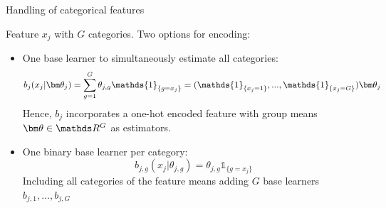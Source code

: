 \documentclass[11pt,compress,t,notes=noshow, xcolor=table]{beamer}
\begin{document}

\begin{framev}{Handling of categorical features}

Feature $x_j$ with $G$ categories. Two options for encoding:

\begin{itemize}
    \item 
        One base learner to simultaneously estimate all categories: 
        $$b_j(x_j | \thetav_j) = \sum_{g=1}^G \theta_{j,g}\mathds{1}_{\{g = x_j\}} = (\mathds{1}_{\{x_j = 1\}}, ..., \mathds{1}_{\{x_j = G\}}) \thetav_j$$
        Hence, $b_j$ incorporates a one-hot encoded feature with group means $\thetav\in\R^G$ as estimators. 
    
    \item 
        One binary base learner per category:
        $$b_{j,g}(x_j | \theta_{j,g}) = \theta_{j,g}\mathds{1}_{\{g = x_j\}}$$  
        Including all categories of the feature means adding $G$ base learners $b_{j,1}, \dots, b_{j,G}$ %
  \end{itemize}

\end{framev}
\end{document}
